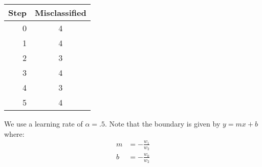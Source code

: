 \documentclass{article}
\begin{document}
\begin{center}
  \begin{tabular}{r|c}
    Step & Misclassified \\
    \hline
    0 & 4 \\
    1 & 4 \\
    2 & 3 \\
    3 & 4 \\
    4 & 3 \\
    5 & 4 
  \end{tabular}
\end{center}

We use a learning rate of $\alpha=.5$. Note that the boundary is given by $y=mx+b$ where:
\begin{align*}
m&=-\frac{w_1}{w_2}\\
b&=-\frac{w_0}{w_2}
\end{align*}
\end{document}
